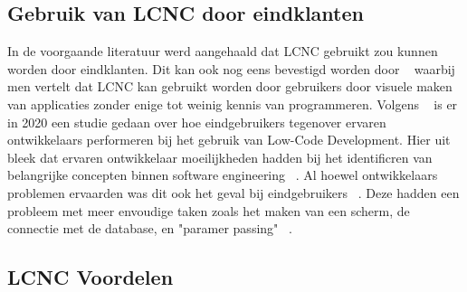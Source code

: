 \subsection*{Gebruik van LCNC door eindklanten}
\label{sub:gebruik-van-lcnc-door-eindklanten}
In de voorgaande literatuur werd aangehaald dat LCNC gebruikt zou kunnen worden door eindklanten. Dit kan ook nog eens bevestigd
worden door ~\textcite{Yan2021} waarbij men vertelt dat LCNC kan gebruikt worden door gebruikers door visuele maken van applicaties zonder enige tot weinig kennis van programmeren. 
Volgens ~\textcite{Hintsch2021} is er in 2020 een studie gedaan over hoe eindgebruikers tegenover ervaren ontwikkelaars performeren bij het gebruik van Low-Code Development.
Hier uit bleek dat ervaren ontwikkelaar moeilijkheden hadden bij het identificren van belangrijke concepten binnen software engineering ~\autocite{Hintsch2021}. Al 
hoewel ontwikkelaars problemen ervaarden was dit ook het geval bij eindgebruikers ~\autocite{Hintsch2021}. Deze hadden een probleem met meer envoudige  taken zoals het maken van een scherm,
de connectie met de database, en "paramer passing" ~\autocite{Hintsch2021}.
\subsection*{LCNC Voordelen}
\label{sub:lcnc-voordelen}







